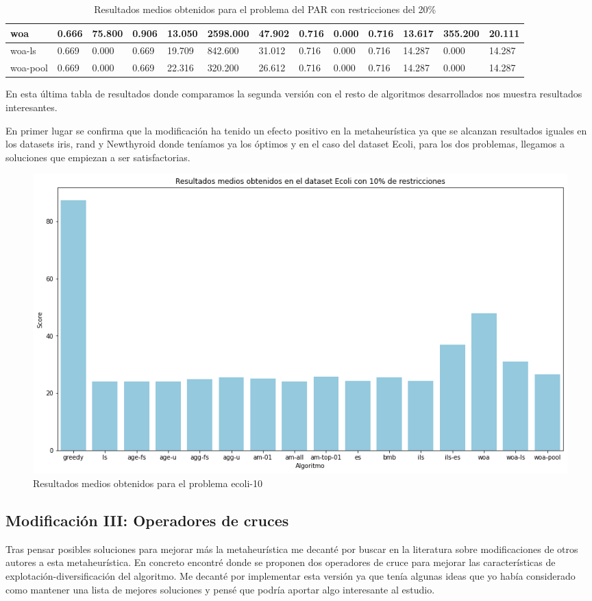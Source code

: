 \documentclass[11pt]{article}
\begin{document}
\begin{table}[H]
{\begin{tabular}{|l|l|l|l|l|l|l|l|l|l|l|l|l|}
    woa & 0.666 & 75.800  & 0.906 &  13.050 & 2598.000 & 47.902 & 0.716 & 0.000  & 0.716 &  13.617 & 355.200 & 20.111  \\ \hline
    woa-ls & 0.669 & 0.000  & 0.669 &  19.709 & 842.600  & 31.012 & 0.716 & 0.000  & 0.716 &   	14.287 & 0.000 &  	14.287  \\ \hline
    woa-pool & 0.669 & 0.000  & 0.669 &  22.316 & 320.200  & 26.612 	 & 0.716 & 0.000  & 0.716 &   	14.287 & 0.000 &  	14.287  \\ \hline
  \end{tabular}}
  \caption{Resultados medios obtenidos para el problema del PAR con restricciones del 20\%}
\end{table}

En esta última tabla de resultados donde comparamos la segunda versión con el
resto de algoritmos desarrollados nos muestra resultados interesantes. 

En primer lugar se confirma que la modificación ha tenido un efecto positivo en
la metaheurística ya que se alcanzan resultados iguales en los datasets iris,
rand y Newthyroid donde teníamos ya los óptimos y en el caso del dataset Ecoli,
para los dos problemas, llegamos a soluciones que empiezan a ser satisfactorias.

\begin{figure}[H]
  \centering
  \includegraphics[width=1\textwidth]{images/comparativa}
  \caption{Resultados medios obtenidos para el problema ecoli-10}
\end{figure}

\subsection{Modificación III: Operadores de cruces}

Tras pensar posibles soluciones para mejorar más la metaheurística me decanté
por buscar en la literatura sobre modificaciones de otros autores a esta
metaheurística. En concreto encontré donde se proponen dos
operadores de cruce para mejorar las características de
explotación-diversificación del algoritmo. Me decanté por implementar esta
versión ya que tenía algunas ideas que yo había considerado como mantener una
lista de mejores soluciones y pensé que podría aportar algo interesante al
estudio.
\end{document}

